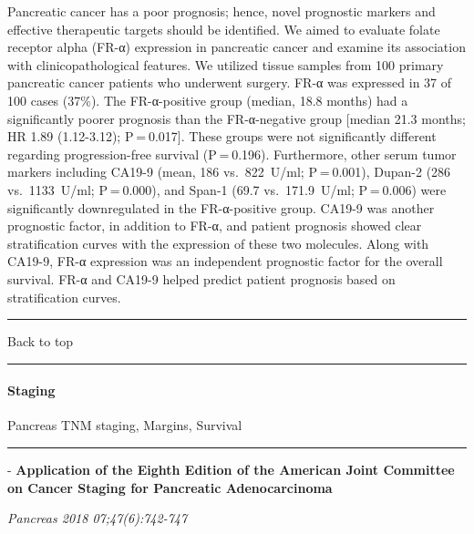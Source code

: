 \documentclass[]{article}
\let\oldparagraph\paragraph
\renewcommand{\paragraph}[1]{\oldparagraph{#1}\mbox{}}
\begin{document}
Pancreatic cancer has a poor prognosis; hence, novel prognostic markers
and effective therapeutic targets should be identified. We aimed to
evaluate folate receptor alpha (FR-α) expression in pancreatic cancer
and examine its association with clinicopathological features. We
utilized tissue samples from 100 primary pancreatic cancer patients who
underwent surgery. FR-α was expressed in 37 of 100 cases (37\%). The
FR-α-positive group (median, 18.8 months) had a significantly poorer
prognosis than the FR-α-negative group {[}median 21.3 months; HR 1.89
(1.12-3.12); P = 0.017{]}. These groups were not significantly different
regarding progression-free survival (P = 0.196). Furthermore, other
serum tumor markers including CA19-9 (mean, 186 vs.~822~U/ml;
P = 0.001), Dupan-2 (286 vs.~1133~U/ml; P = 0.000), and Span-1 (69.7
vs.~171.9~U/ml; P = 0.006) were significantly downregulated in the
FR-α-positive group. CA19-9 was another prognostic factor, in addition
to FR-α, and patient prognosis showed clear stratification curves with
the expression of these two molecules. Along with CA19-9, FR-α
expression was an independent prognostic factor for the overall
survival. FR-α and CA19-9 helped predict patient prognosis based on
stratification curves.

{}

{}

\begin{center}\rule{0.5\linewidth}{\linethickness}\end{center}

Back to top

\begin{center}\rule{0.5\linewidth}{\linethickness}\end{center}

\pagebreak

\hypertarget{staging}{%
\paragraph{Staging}\label{staging}}

Pancreas TNM staging, Margins, Survival

\begin{center}\rule{0.5\linewidth}{\linethickness}\end{center}

 - \textbf{Application of the Eighth Edition of the American Joint
Committee on Cancer Staging for Pancreatic Adenocarcinoma}

\emph{Pancreas 2018 07;47(6):742-747}
\end{document}
